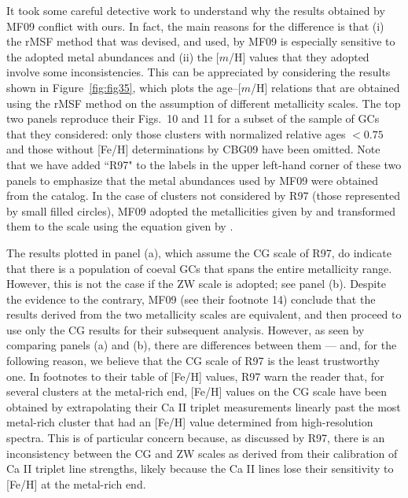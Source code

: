 \documentclass[12pt,preprint]{aastex}
\begin{document}
It took some careful detective work to understand why the results obtained by
MF09 conflict with ours.  In fact, the main reasons for the difference is that
(i) the rMSF method that was devised, and used, by MF09 is especially sensitive
to the adopted metal abundances and (ii) the [$m$/H] values that they adopted
involve some inconsistencies.  This can be appreciated by considering the
results shown in Figure~\ref{fig:fig35}, which plots the age--[$m$/H] relations
that are obtained using the rMSF method on the assumption of different
metallicity scales.  The top two panels reproduce their Figs.~10 and 11 for
a subset of the sample of GCs that they considered: only those clusters
with normalized relative ages $< 0.75$ and those without [Fe/H] determinations
by CBG09 have been omitted.  Note that we have added ``R97" to the labels in
the upper left-hand corner of these two panels to emphasize that the metal
abundances used by MF09 were obtained from the \citet[hereafter R97]{rhs97}
catalog. In the case of clusters not considered by R97 (those represented by
small filled circles), MF09 adopted the metallicities given by \citet[hereafter
ZW]{zw84} and transformed them to the \citet[hereafter CG]{cg97} scale using
the equation given by \citet{ccg01}.

The results plotted in panel (a), which assume the CG scale of R97, do indicate
that there is a population of coeval GCs that spans the entire metallicity
range.  However, this is not the case if the ZW scale is adopted; see panel (b).
Despite the evidence to the contrary, MF09 (see their footnote 14) conclude
that the results derived from the two metallicity scales are equivalent, and
then proceed to use only the CG results for their subsequent analysis.  However,
as seen by comparing panels (a) and (b), there are differences between them ---
and, for the following reason, we believe that the CG scale of R97 is the least
trustworthy one.  In footnotes to their table of [Fe/H] values, R97 warn the
reader that, for several clusters at the metal-rich end, [Fe/H] values on the
CG scale have been obtained by extrapolating their Ca II triplet measurements
linearly past the most metal-rich cluster that had an [Fe/H] value determined
from high-resolution spectra.  This is of particular concern because, as
discussed by R97, there is an inconsistency between the CG and ZW scales as
derived from their calibration of Ca II triplet line strengths, likely because
the Ca II lines lose their sensitivity to [Fe/H] at the metal-rich end.  
\end{document}
